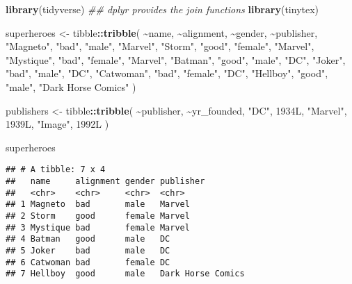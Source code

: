 \documentclass[
]{article}
\newenvironment{Shaded}{\begin{snugshade}}{\end{snugshade}}
\newcommand{\CommentTok}[1]{\textcolor[rgb]{0.56,0.35,0.01}{\textit{#1}}}
\newcommand{\KeywordTok}[1]{\textcolor[rgb]{0.13,0.29,0.53}{\textbf{#1}}}
\newcommand{\NormalTok}[1]{#1}
\newcommand{\OperatorTok}[1]{\textcolor[rgb]{0.81,0.36,0.00}{\textbf{#1}}}
\newcommand{\StringTok}[1]{\textcolor[rgb]{0.31,0.60,0.02}{#1}}
\begin{document}
\begin{Shaded}
\begin{Highlighting}[]
\KeywordTok{library}\NormalTok{(tidyverse) }\CommentTok{\#\# dplyr provides the join functions}
\KeywordTok{library}\NormalTok{(tinytex)}

\NormalTok{superheroes \textless{}{-}}\StringTok{ }\NormalTok{tibble}\OperatorTok{::}\KeywordTok{tribble}\NormalTok{(}
       \OperatorTok{\textasciitilde{}}\NormalTok{name, }\OperatorTok{\textasciitilde{}}\NormalTok{alignment,  }\OperatorTok{\textasciitilde{}}\NormalTok{gender,          }\OperatorTok{\textasciitilde{}}\NormalTok{publisher,}
   \StringTok{"Magneto"}\NormalTok{,      }\StringTok{"bad"}\NormalTok{,   }\StringTok{"male"}\NormalTok{,            }\StringTok{"Marvel"}\NormalTok{,}
     \StringTok{"Storm"}\NormalTok{,     }\StringTok{"good"}\NormalTok{, }\StringTok{"female"}\NormalTok{,            }\StringTok{"Marvel"}\NormalTok{,}
  \StringTok{"Mystique"}\NormalTok{,      }\StringTok{"bad"}\NormalTok{, }\StringTok{"female"}\NormalTok{,            }\StringTok{"Marvel"}\NormalTok{,}
    \StringTok{"Batman"}\NormalTok{,     }\StringTok{"good"}\NormalTok{,   }\StringTok{"male"}\NormalTok{,                }\StringTok{"DC"}\NormalTok{,}
     \StringTok{"Joker"}\NormalTok{,      }\StringTok{"bad"}\NormalTok{,   }\StringTok{"male"}\NormalTok{,                }\StringTok{"DC"}\NormalTok{,}
  \StringTok{"Catwoman"}\NormalTok{,      }\StringTok{"bad"}\NormalTok{, }\StringTok{"female"}\NormalTok{,                }\StringTok{"DC"}\NormalTok{,}
   \StringTok{"Hellboy"}\NormalTok{,     }\StringTok{"good"}\NormalTok{,   }\StringTok{"male"}\NormalTok{, }\StringTok{"Dark Horse Comics"}
\NormalTok{  )}

\NormalTok{publishers \textless{}{-}}\StringTok{ }\NormalTok{tibble}\OperatorTok{::}\KeywordTok{tribble}\NormalTok{(}
  \OperatorTok{\textasciitilde{}}\NormalTok{publisher, }\OperatorTok{\textasciitilde{}}\NormalTok{yr\_founded,}
        \StringTok{"DC"}\NormalTok{,       1934L,}
    \StringTok{"Marvel"}\NormalTok{,       1939L,}
     \StringTok{"Image"}\NormalTok{,       1992L}
\NormalTok{  )}

\NormalTok{superheroes}
\end{Highlighting}
\end{Shaded}

\begin{verbatim}
## # A tibble: 7 x 4
##   name     alignment gender publisher        
##   <chr>    <chr>     <chr>  <chr>            
## 1 Magneto  bad       male   Marvel           
## 2 Storm    good      female Marvel           
## 3 Mystique bad       female Marvel           
## 4 Batman   good      male   DC               
## 5 Joker    bad       male   DC               
## 6 Catwoman bad       female DC               
## 7 Hellboy  good      male   Dark Horse Comics
\end{verbatim}
\end{document}
